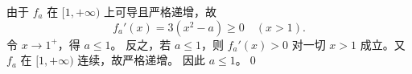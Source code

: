 由于 $f_a$ 在 $[1,+\infty)$ 上可导且严格递增，故
\[
f_a'(x)=3(x^2-a)\ge0\quad(x>1).
\]
令 $x\to1^+$，得 $a\le1$。
反之，若 $a\le1$，则 $f_a'(x)>0$ 对一切 $x>1$ 成立。又 $f_a$ 在 $[1,+\infty)$ 连续，故严格递增。
因此 $\boxed{a\le1}$。\qed
